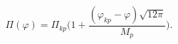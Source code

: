 \begin{equation} \label{motionP}
\Pi(\varphi)=\Pi_{kp}\Biggl(1 +\frac{ (\varphi_{kp}-\varphi)
\sqrt{12 \pi}}{M_{p}} \Biggr).
\end{equation}

